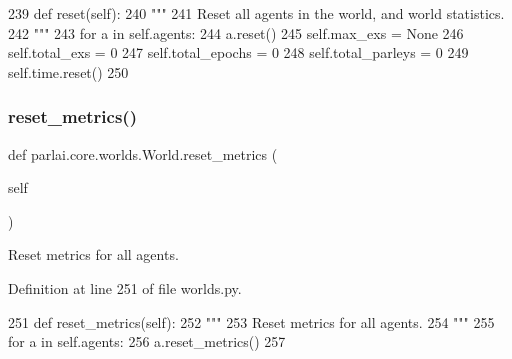\begin{DoxyCode}
239     \textcolor{keyword}{def }reset(self):
240         \textcolor{stringliteral}{"""}
241 \textcolor{stringliteral}{        Reset all agents in the world, and world statistics.}
242 \textcolor{stringliteral}{        """}
243         \textcolor{keywordflow}{for} a \textcolor{keywordflow}{in} self.agents:
244             a.reset()
245         self.max\_exs = \textcolor{keywordtype}{None}
246         self.total\_exs = 0
247         self.total\_epochs = 0
248         self.total\_parleys = 0
249         self.time.reset()
250 
\end{DoxyCode}
\mbox{\label{classparlai_1_1core_1_1worlds_1_1World_af26e2aacab6282f8ef19f278d638adea}} 
\subsubsection{\texorpdfstring{reset\+\_\+metrics()}{reset\_metrics()}}
{\footnotesize\ttfamily def parlai.\+core.\+worlds.\+World.\+reset\+\_\+metrics (\begin{DoxyParamCaption}\item[{}]{self }\end{DoxyParamCaption})}

\begin{DoxyVerb}Reset metrics for all agents.
\end{DoxyVerb}
 

Definition at line 251 of file worlds.\+py.


\begin{DoxyCode}
251     \textcolor{keyword}{def }reset\_metrics(self):
252         \textcolor{stringliteral}{"""}
253 \textcolor{stringliteral}{        Reset metrics for all agents.}
254 \textcolor{stringliteral}{        """}
255         \textcolor{keywordflow}{for} a \textcolor{keywordflow}{in} self.agents:
256             a.reset\_metrics()
257 
\end{DoxyCode}
\mbox{\label{classparlai_1_1core_1_1worlds_1_1World_a08d9212397f136cbc52ee224bcb0bc4e}} 

